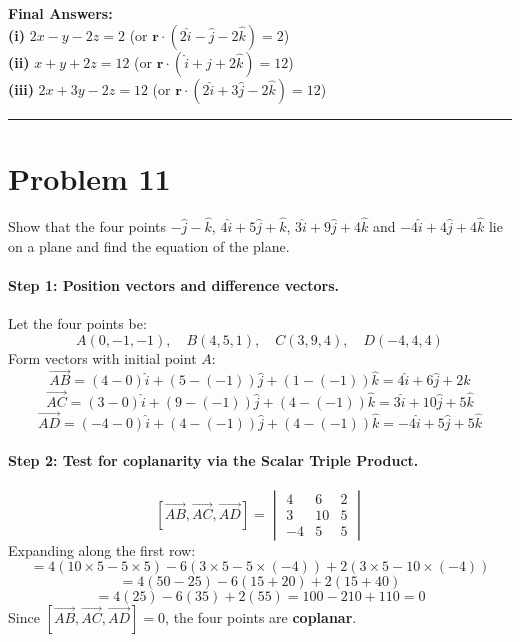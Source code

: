 \documentclass[11pt,a4paper]{article}
\begin{document}
\begin{resultbox}
\textbf{Final Answers:}\\
\textbf{(i)} $\boxed{2x - y - 2z = 2}$ \quad (or $\mathbf{r}\cdot(2\hat{i} - \hat{j} - 2\hat{k}) = 2$)\\
\textbf{(ii)} $\boxed{x + y + 2z = 12}$ \quad (or $\mathbf{r}\cdot(\hat{i} + \hat{j} + 2\hat{k}) = 12$)\\
\textbf{(iii)} $\boxed{2x + 3y - 2z = 12}$ \quad (or $\mathbf{r}\cdot(2\hat{i} + 3\hat{j} - 2\hat{k}) = 12$)
\end{resultbox}

\vspace{0.4cm}
\hrule
\vspace{0.4cm}

\section{Problem 11}
\begin{problembox}[Problem 11]
Show that the four points $-\hat{j} - \hat{k}$, $4\hat{i} + 5\hat{j} + \hat{k}$, $3\hat{i} + 9\hat{j} + 4\hat{k}$ and $-4\hat{i} + 4\hat{j} + 4\hat{k}$ lie on a plane and find the equation of the plane.
\end{problembox}

\paragraph{Step 1: Position vectors and difference vectors.}
Let the four points be:
$$A(0, -1, -1), \quad B(4, 5, 1), \quad C(3, 9, 4), \quad D(-4, 4, 4)$$
Form vectors with initial point $A$:
$$\vec{AB} = (4 - 0)\hat{i} + (5 - (-1))\hat{j} + (1 - (-1))\hat{k} = 4\hat{i} + 6\hat{j} + 2\hat{k}$$
$$\vec{AC} = (3 - 0)\hat{i} + (9 - (-1))\hat{j} + (4 - (-1))\hat{k} = 3\hat{i} + 10\hat{j} + 5\hat{k}$$
$$\vec{AD} = (-4 - 0)\hat{i} + (4 - (-1))\hat{j} + (4 - (-1))\hat{k} = -4\hat{i} + 5\hat{j} + 5\hat{k}$$

\paragraph{Step 2: Test for coplanarity via the Scalar Triple Product.}
$$[\vec{AB}, \vec{AC}, \vec{AD}] = \begin{vmatrix} 4 & 6 & 2 \\ 3 & 10 & 5 \\ -4 & 5 & 5 \end{vmatrix}$$
Expanding along the first row:
$$= 4(10\times 5 - 5\times 5) - 6(3\times 5 - 5\times(-4)) + 2(3\times 5 - 10\times(-4))$$
$$= 4(50 - 25) - 6(15 + 20) + 2(15 + 40)$$
$$= 4(25) - 6(35) + 2(55) = 100 - 210 + 110 = 0$$
Since $[\vec{AB}, \vec{AC}, \vec{AD}] = 0$, the four points are \textbf{coplanar}.
\end{document}

